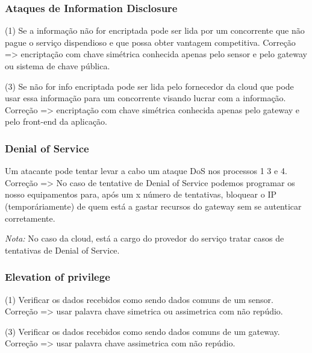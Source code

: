 \subsubsection{Ataques de Information Disclosure}
\par\hfill
\par (1) Se a informação não for encriptada pode ser lida por um concorrente que não pague o serviço dispendioso e que possa obter vantagem competitiva.\newline
Correção => encriptação com chave simétrica conhecida apenas pelo sensor e  pelo gateway ou sistema de chave pública.\newline
\par (3) Se não for info encriptada pode ser lida pelo fornecedor da cloud que pode usar essa informação para um concorrente visando lucrar com a informação.\newline
Correção => encriptação com chave simétrica conhecida apenas pelo gateway e pelo front-end da aplicação.\newline

\subsubsection{Denial of Service}
\par\hfill
\par Um atacante pode tentar levar a cabo um ataque DoS nos processos 1 3 e 4.
Correção => No caso de tentative de Denial of Service podemos programar os nosso equipamentos para, após um x número de tentativas, bloquear o IP (temporáriamente) de quem está a gastar recursos do gateway sem se autenticar corretamente.\newline


\textit{Nota:} No caso da cloud, está a cargo do provedor do serviço tratar casos de tentativas de Denial of Service.\newline

\subsubsection{Elevation of privilege}
\par\hfill
\par (1) Verificar os dados recebidos como sendo dados comuns de um sensor.\newline
Correção => usar palavra chave simetrica ou assimetrica com não repúdio.\newline

\par (3) Verificar os dados recebidos como sendo dados comuns de um gateway.\newline
Correção => usar palavra chave assimetrica com não repúdio. \newline

